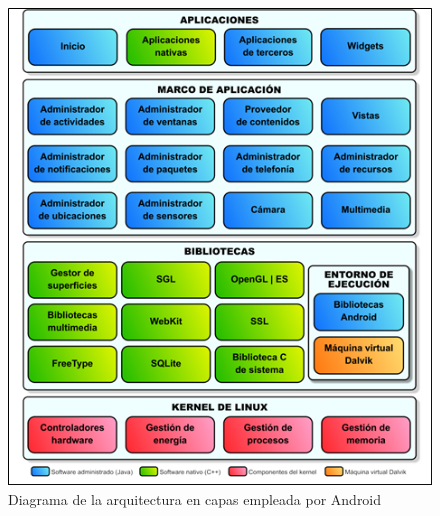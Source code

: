 \begin{figure}
\begin{centering}
\includegraphics[scale=0.77]{images/Android-architecture}
\par\end{centering}

\caption{Diagrama de la arquitectura en capas empleada por Android\label{fig:Android-architecture}}
\end{figure}

